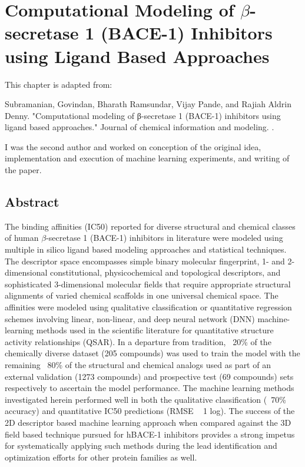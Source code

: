 \section{Computational Modeling of $\beta$-secretase 1 (BACE-1) Inhibitors using Ligand Based Approaches}

This chapter is adapted from: 

Subramanian, Govindan, Bharath Ramsundar, Vijay Pande, and Rajiah Aldrin Denny. "Computational modeling of β-secretase 1 (BACE-1) inhibitors using ligand based approaches." Journal of chemical information and modeling. \cite{subramanian2016computational}.

I was the second author and worked on conception of the original idea, implementation and execution of machine learning experiments, and writing of the paper.

\subsection{Abstract}
The binding affinities (IC50) reported for diverse structural and chemical classes of human $\beta$-secretase 1 (BACE-1) inhibitors in literature were modeled using multiple in silico ligand based modeling approaches and statistical techniques.  The descriptor space encompasses simple binary molecular fingerprint, 1- and 2-dimensional constitutional, physicochemical and topological descriptors, and sophisticated 3-dimensional molecular fields that require appropriate structural alignments of varied chemical scaffolds in one universal chemical space.  The affinities were modeled using qualitative classification or quantitative regression schemes involving linear, non-linear, and deep neural network (DNN) machine-learning methods used in the scientific literature for quantitative structure activity relationships (QSAR).  In a departure from tradition, ~20\% of the chemically diverse dataset (205 compounds) was used to train the model with the remaining ~80\% of the structural and chemical analogs used as part of an external validation (1273 compounds) and prospective test (69 compounds) sets respectively to ascertain the model performance.  The machine learning methods investigated herein performed well in both the qualitative classification (~70\% accuracy) and quantitative IC50 predictions (RMSE ~ 1 log).  The success of the 2D descriptor based machine learning approach when compared against the 3D field based technique pursued for hBACE-1 inhibitors provides a strong impetus for systematically applying such methods during the lead identification and optimization efforts for other protein families as well.


